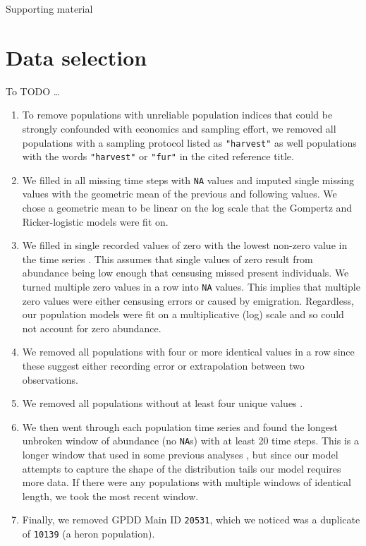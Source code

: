 \documentclass[11pt]{article}
\begin{document}
\clearpage

\begin{centering}
\LARGE
Supporting material\\[1.5em]
\end{centering}

\section{Data selection}

To TODO \ldots

\begin{enumerate}

\item To remove populations with unreliable population indices that could be strongly confounded with economics and sampling effort, we removed all populations with a sampling protocol listed as \texttt{"harvest"} as well populations with the words \texttt{"harvest"} or \texttt{"fur"} in the cited reference title.
\item We filled in all missing time steps with \texttt{NA} values and imputed single missing values with the geometric mean of the previous and following values. We chose a geometric mean to be linear on the log scale that the Gompertz and Ricker-logistic models were fit on.
\item We filled in single recorded values of zero with the lowest non-zero value in the time series \citep[following][]{brook2006a}. This assumes that single values of zero result from abundance being low enough that censusing missed present individuals. We turned multiple zero values in a row into \texttt{NA} values. This implies that multiple zero values were either censusing errors or caused by emigration. Regardless, our population  models were fit on a multiplicative (log) scale and so could not account for zero abundance.
\item We removed all populations with four or more identical values in a row since these suggest either recording error or extrapolation between two observations.
\item We removed all populations without at least four unique values \citep[following][]{brook2006a}.
\item We then went through each population time series and found the longest unbroken  window of abundance (no \texttt{NA}s) with at least 20 time steps. This is a longer window that used in some previous analyses \citep[e.g.][]{brook2006a}, but since our model attempts to capture the shape of the distribution tails our model requires more data. If there were any populations with multiple windows of identical length, we took the most recent window.
\item Finally, we removed GPDD Main ID \texttt{20531}, which we noticed was a duplicate of \texttt{10139} (a heron population). 
\end{enumerate}
\end{document}
